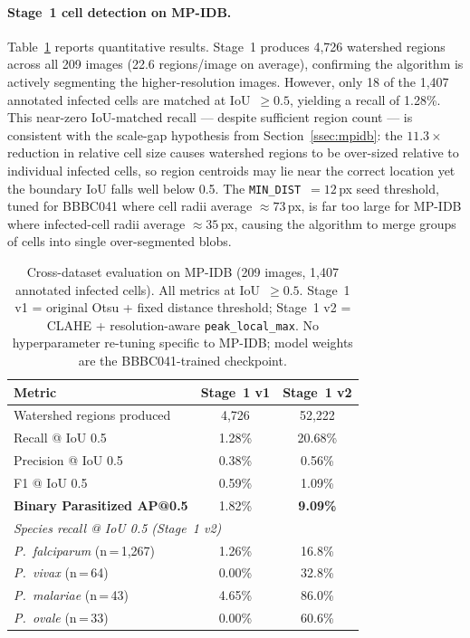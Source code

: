 \documentclass[review,12pt]{elsarticle}
\begin{document}
\paragraph{Stage~1 cell detection on MP-IDB.}
Table~\ref{tab:e2e_mpidb} reports quantitative results.
Stage~1 produces 4,726 watershed regions across all 209 images
(22.6 regions/image on average), confirming the algorithm is actively
segmenting the higher-resolution images. However, only 18 of the 1,407
annotated infected cells are matched at IoU~$\geq 0.5$, yielding a
recall of 1.28\%. This near-zero IoU-matched recall --- despite
sufficient region count --- is consistent with the scale-gap hypothesis
from Section~\ref{ssec:mpidb}: the $11.3\times$ reduction in relative
cell size causes watershed regions to be over-sized relative to individual
infected cells, so region centroids may lie near the correct location yet
the boundary IoU falls well below 0.5. The \texttt{MIN\_DIST}~$= 12$\,px
seed threshold, tuned for BBBC041 where cell radii average $\approx
73$\,px, is far too large for MP-IDB where infected-cell radii average
$\approx 35$\,px, causing the algorithm to merge groups of cells into
single over-segmented blobs.

\begin{table}[H]
\centering
\small
\caption{Cross-dataset evaluation on MP-IDB (209 images, 1,407 annotated
  infected cells). All metrics at IoU~$\geq 0.5$. Stage~1 v1 = original
  Otsu + fixed distance threshold; Stage~1 v2 = CLAHE + resolution-aware
  \texttt{peak\_local\_max}. No hyperparameter re-tuning specific to
  MP-IDB; model weights are the BBBC041-trained checkpoint.}
\label{tab:e2e_mpidb}
\renewcommand{\arraystretch}{1.15}
\begin{tabular}{lcc}
\toprule
\textbf{Metric} & \textbf{Stage~1 v1} & \textbf{Stage~1 v2} \\
\midrule
Watershed regions produced  & 4,726   & 52,222 \\
Recall @ IoU 0.5            & 1.28\%  & 20.68\% \\
Precision @ IoU 0.5         & 0.38\%  & 0.56\% \\
F1 @ IoU 0.5                & 0.59\%  & 1.09\% \\
\midrule
\textbf{Binary Parasitized AP@0.5} & 1.82\% & \textbf{9.09\%} \\
\midrule
\multicolumn{3}{l}{\textit{Species recall @ IoU 0.5 (Stage~1 v2)}} \\
\textit{P.\ falciparum} (n\,=\,1{,}267) & 1.26\% & 16.8\% \\
\textit{P.\ vivax} (n\,=\,64)           & 0.00\% & 32.8\% \\
\textit{P.\ malariae} (n\,=\,43)        & 4.65\% & 86.0\% \\
\textit{P.\ ovale} (n\,=\,33)           & 0.00\% & 60.6\% \\
\bottomrule
\end{tabular}
\end{table}
\end{document}
